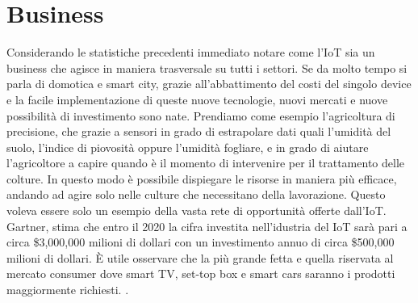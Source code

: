 \section{Business}
Considerando le statistiche precedenti immediato notare come l'IoT sia un
business che agisce in maniera trasversale su tutti i settori.  Se da molto
tempo si parla di domotica e smart city, grazie all'abbattimento del costi del
singolo  device e la facile implementazione di queste nuove tecnologie,  nuovi
mercati e nuove possibilità di investimento sono nate. Prendiamo come esempio
l'agricoltura di precisione, che grazie a sensori in grado di estrapolare dati
quali l'umidità del suolo, l'indice di piovosità oppure l'umidità  fogliare,
e in grado di aiutare l'agricoltore a  capire quando è il momento di intervenire per il
trattamento delle colture. In questo modo è possibile dispiegare le risorse in
maniera più efficace, andando ad agire solo nelle culture che necessitano della
lavorazione.
Questo voleva essere solo un esempio della vasta rete di  opportunità  offerte dall'IoT.
Gartner, stima che entro il 2020 la cifra investita nell'idustria del IoT
sarà pari a circa \$3,000,000 milioni di dollari con un investimento annuo di
circa \$500,000 milioni di dollari. È utile osservare che la più grande fetta e quella
riservata al mercato consumer dove smart TV, set-top box e smart cars saranno i prodotti
maggiormente richiesti.
\cite{gartner2016}. 



